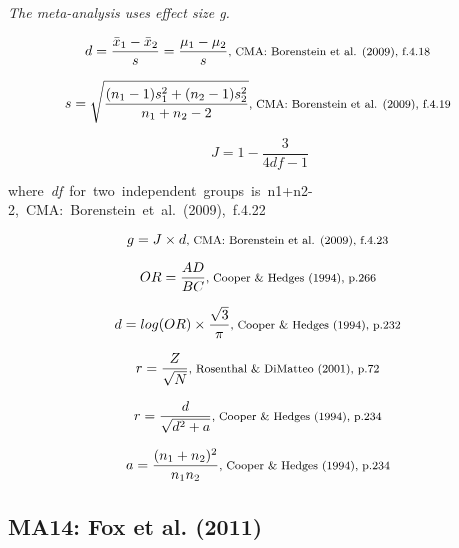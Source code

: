 \documentclass{article}
\begin{document}
\vspace{3mm}
\textit{The meta-analysis uses effect size g.}

\begin{equation*}
d={\frac {{\bar {x}}_{1}-{\bar {x}}_{2}}{s}}={\frac {\mu_{1}-\mu_{2}}{s}} \mbox{\footnotesize, CMA: Borenstein et al. (2009), f.4.18 } 
\end{equation*}

\begin{equation*}
s={\sqrt {\frac {(n_{1}-1)s_{1}^{2}+(n_{2}-1)s_{2}^{2}}{n_{1}+n_{2}-2}}} \mbox{\footnotesize, CMA: Borenstein et al. (2009), f.4.19 } 
\end{equation*}

\begin{equation*}
J={1-{\frac {3}{4df-1}}} 
\end{equation*} 

\mbox{\footnotesize where \textit{df} for two independent groups is n1+n2-2, CMA: Borenstein et al. (2009), f.4.22 }

\begin{equation*}
g=J \times d \mbox{\footnotesize, CMA: Borenstein et al. (2009), f.4.23 } 
\end{equation*}

\begin{equation*}
OR={\frac {AD}{BC}} \mbox{\footnotesize, Cooper \& Hedges (1994), p.266 }
\end{equation*}

\begin{equation*}
d=log(OR) \times {\frac {\sqrt{3}}{\pi}} \mbox{\footnotesize, Cooper \& Hedges (1994), p.232 }
\end{equation*}

\begin{equation*}
r= \frac{Z}{\sqrt{N}} \mbox{\footnotesize, Rosenthal \& DiMatteo (2001), p.72 }
\end{equation*}

\begin{equation*}
r=\frac{d}{\sqrt{d^{2}+a}} \mbox{\footnotesize, Cooper \& Hedges (1994), p.234 }
\end{equation*}

\begin{equation*}
a=\frac{(n_{1}+n_{2})^{2}}{n_{1}n_{2}} \mbox{\footnotesize, Cooper \& Hedges (1994), p.234 }
\end{equation*}

\subsection*{MA14: Fox et al. (2011)}
\end{document}
